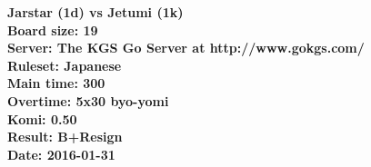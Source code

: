 \documentclass{article}
\begin{document}
\begin{titlepage}
    \null
    \vfill
    \begin{center}
        \textbf{Jarstar (1d) vs Jetumi (1k)}\\
        \textbf{Board size: 19}\\
        \textbf{Server: The KGS Go Server at http://www.gokgs.com/}\\
        \textbf{Ruleset: Japanese}\\
        \textbf{Main time: 300}\\
        \textbf{Overtime: 5x30 byo-yomi}\\
        \textbf{Komi: 0.50}\\
        \textbf{Result: B+Resign}\\
        \textbf{Date: 2016-01-31}
    \end{center}
    \vfill
\end{titlepage}
\newpage
\end{document}
